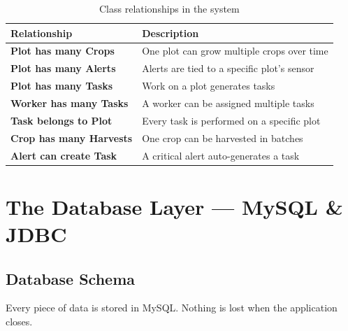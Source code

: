 \documentclass[12pt, a4paper]{report}
\begin{document}
\begin{table}[H]
\centering
\renewcommand{\arraystretch}{1.5}
\begin{tabularx}{\textwidth}{>{\bfseries}l X}
\toprule
\textbf{Relationship} & \textbf{Description} \\
\midrule
Plot has many Crops    & One plot can grow multiple crops over time \\
Plot has many Alerts   & Alerts are tied to a specific plot's sensor \\
Plot has many Tasks    & Work on a plot generates tasks \\
Worker has many Tasks  & A worker can be assigned multiple tasks \\
Task belongs to Plot   & Every task is performed on a specific plot \\
Crop has many Harvests & One crop can be harvested in batches \\
Alert can create Task  & A critical alert auto-generates a task \\
\bottomrule
\end{tabularx}
\caption{Class relationships in the system}
\end{table}


\chapter{The Database Layer --- MySQL \& JDBC}

\section{Database Schema}

Every piece of data is stored in MySQL. Nothing is lost when the application closes.
\end{document}
